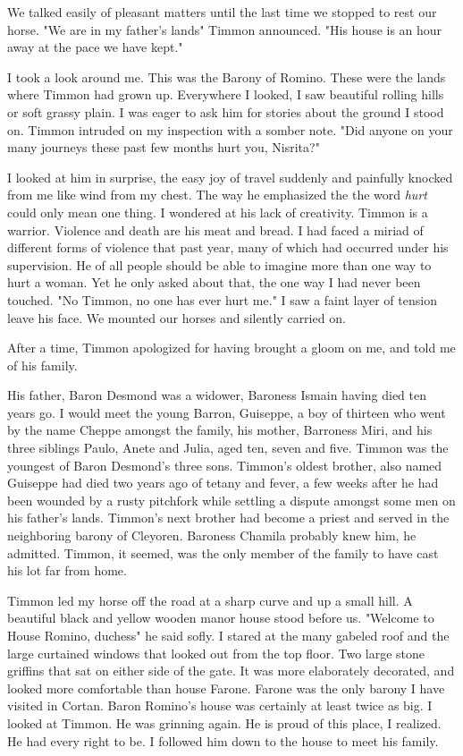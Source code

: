 \documentclass{article}
\begin{document}
We talked easily of pleasant matters until the last time we stopped to rest our horse. "We are in my father's lands" Timmon announced. "His house is an hour away at the pace we have kept."

I took a look around me. This was the Barony of Romino. These were the lands where Timmon had grown up. Everywhere I looked, I saw beautiful rolling hills or soft grassy plain. I was eager to ask him for stories about the ground I stood on. Timmon intruded on my inspection with a somber note. "Did anyone on your many journeys these past few months hurt you, Nisrita?"

I looked at him in surprise, the easy joy of travel suddenly and painfully knocked from me like wind from my chest. The way he emphasized the the word \emph{hurt} could only mean one thing. I wondered at his lack of creativity. Timmon is a warrior. Violence and death are his meat and bread. I had faced a miriad of different forms of violence that past year, many of which had occurred under his supervision. He of all people should be able to imagine more than one way to hurt a woman. Yet he only asked about that, the one way I had never been touched. "No Timmon, no one has ever hurt me." I saw a faint layer of tension leave his face. We mounted our horses and silently carried on. 

After a time, Timmon apologized for having brought a gloom on me, and told me of his family.

His father, Baron Desmond was a widower, Baroness Ismain having died ten years go. I would meet the young Barron, Guiseppe, a boy of thirteen who went by the name Cheppe amongst the family, his mother, Barroness Miri, and his three siblings Paulo, Anete and Julia, aged ten, seven and five. Timmon was the youngest of Baron Desmond's three sons. Timmon's oldest brother, also named Guiseppe had died two years ago of tetany and fever, a few weeks after he had been wounded by a rusty pitchfork while settling a dispute amongst some men on his father's lands. Timmon's next brother had become a priest and served in the neighboring barony of Cleyoren. Baroness Chamila probably knew him, he admitted. Timmon, it seemed, was the only member of the family to have cast his lot far from home.

Timmon led my horse off the road at a sharp curve and up a small hill. A beautiful black and yellow wooden manor house stood before us. "Welcome to House Romino, duchess" he said sofly. I stared at the many gabeled roof and the large curtained windows that looked out from the top floor. Two large stone griffins that sat on either side of the gate. It was more elaborately decorated, and looked more comfortable than house Farone. Farone was the only barony I have visited in Cortan. Baron Romino's house was certainly at least twice as big. I looked at Timmon. He was grinning again. He is proud of this place, I realized. He had every right to be. I followed him down to the house to meet his family. 
\end{document}
